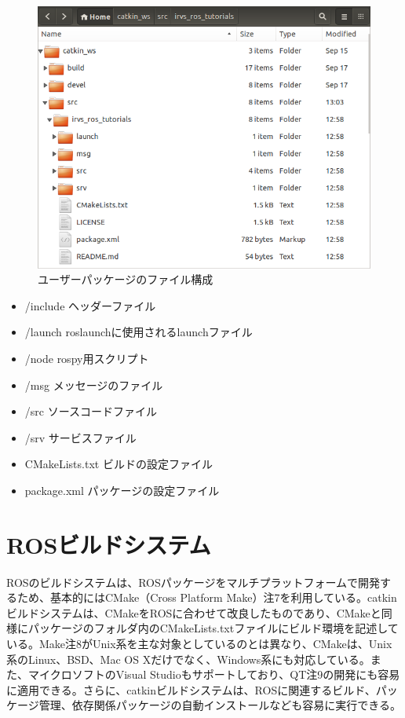 \begin{figure}[h]
  \centering
  \includegraphics[width=12cm]{pictures/chapter3/pic_03_16.png}
  \caption{ユーザーパッケージのファイル構成}
\end{figure}

\begin{itemize}
\item /include    ヘッダーファイル
\item /launch   roslaunchに使用されるlaunchファイル
\item /node     rospy用スクリプト
\item /msg      メッセージのファイル
\item /src      ソースコードファイル
\item /srv      サービスファイル
\item CMakeLists.txt  ビルドの設定ファイル
\item package.xml   パッケージの設定ファイル
\end{itemize}

\section{ROSビルドシステム}

ROSのビルドシステムは、ROSパッケージをマルチプラットフォームで開発するため、基本的にはCMake（Cross Platform Make）注7を利用している。catkinビルドシステムは、CMakeをROSに合わせて改良したものであり、CMakeと同様にパッケージのフォルダ内のCMakeLists.txtファイルにビルド環境を記述している。Make注8がUnix系を主な対象としているのとは異なり、CMakeは、Unix系のLinux、BSD、Mac OS Xだけでなく、Windows系にも対応している。また、マイクロソフトのVisual Studioもサポートしており、QT注9の開発にも容易に適用できる。さらに、catkinビルドシステムは、ROSに関連するビルド、パッケージ管理、依存関係パッケージの自動インストールなども容易に実行できる。

